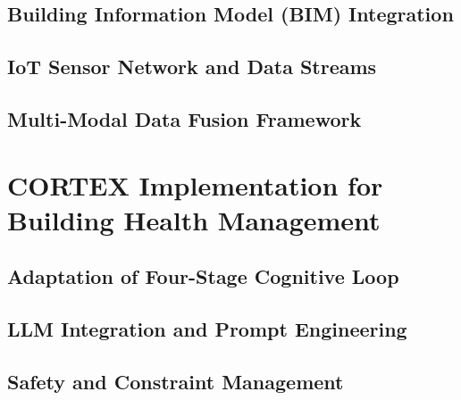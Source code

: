 \subsection{Building Information Model (BIM) Integration}

\subsection{IoT Sensor Network and Data Streams}

\subsection{Multi-Modal Data Fusion Framework}

\section{CORTEX Implementation for Building Health Management}

\subsection{Adaptation of Four-Stage Cognitive Loop}

\subsection{LLM Integration and Prompt Engineering}

\subsection{Safety and Constraint Management}

